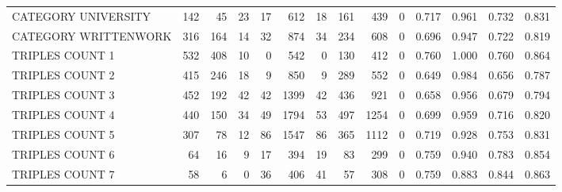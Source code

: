 \begin{tabular}{lrrrrrrrrrllll}
 CATEGORY UNIVERSITY      &             142 &            45 &              23 &              17 &             612 &   18 &  161 &  439 &    0 & 0.717 & 0.961 & 0.732 & 0.831 \\
 CATEGORY WRITTENWORK     &             316 &           164 &              14 &              32 &             874 &   34 &  234 &  608 &    0 & 0.696 & 0.947 & 0.722 & 0.819 \\
 TRIPLES COUNT 1          &             532 &           408 &              10 &               0 &             542 &    0 &  130 &  412 &    0 & 0.760 & 1.000 & 0.760 & 0.864 \\
 TRIPLES COUNT 2          &             415 &           246 &              18 &               9 &             850 &    9 &  289 &  552 &    0 & 0.649 & 0.984 & 0.656 & 0.787 \\
 TRIPLES COUNT 3          &             452 &           192 &              42 &              42 &            1399 &   42 &  436 &  921 &    0 & 0.658 & 0.956 & 0.679 & 0.794 \\
 TRIPLES COUNT 4          &             440 &           150 &              34 &              49 &            1794 &   53 &  497 & 1254 &    0 & 0.699 & 0.959 & 0.716 & 0.820 \\
 TRIPLES COUNT 5          &             307 &            78 &              12 &              86 &            1547 &   86 &  365 & 1112 &    0 & 0.719 & 0.928 & 0.753 & 0.831 \\
 TRIPLES COUNT 6          &              64 &            16 &               9 &              17 &             394 &   19 &   83 &  299 &    0 & 0.759 & 0.940 & 0.783 & 0.854 \\
 TRIPLES COUNT 7          &              58 &             6 &               0 &              36 &             406 &   41 &   57 &  308 &    0 & 0.759 & 0.883 & 0.844 & 0.863 \\
\hline
\end{tabular}